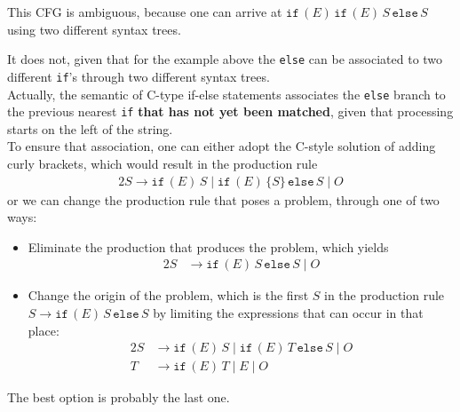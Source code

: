 \documentclass[docid=CA07]{tcom_CA}
\begin{document}
\setcounter{chapter}{6}
{
\renewcommand{\thesubsubsection}{\thesubsection\alph{subsubsection}}
This CFG is ambiguous, because one can arrive at $\mathtt{if}\,(E)\,\mathtt{if}\,(E)\,S\,\mathtt{else}\,S$ using two different syntax trees.
\begin{center}
\begin{minipage}{0.45\textwidth}
	\begin{center}
	\end{center}
\end{minipage}%
\begin{minipage}{0.40\textwidth}
	\begin{center}
	\end{center}
\end{minipage}
\end{center}
It does not, given that for the example above the \texttt{else} can be associated to two different \texttt{if}'s through two different syntax trees.\\
Actually, the semantic of C-type if-else statements associates the \texttt{else} branch to the previous nearest \texttt{if} \textbf{that has not yet been matched}, given that processing starts on the left of the string.\\
To ensure that association, one can either adopt the C-style solution of adding curly brackets, which would result in the production rule
\begin{alignat*}{2}
	S \rightarrow \mathtt{if}\,(E)\,S\mid \mathtt{if}\,(E)\,\{S\}\,\mathtt{else}\,S\mid O
\end{alignat*}
or we can change the production rule that poses a problem, through one of two ways:
\begin{itemize}
	\item Eliminate the production that produces the problem, which yields
	\begin{alignat*}{2}
		S &\rightarrow \mathtt{if}\,(E)\,S\,\mathtt{else}\,S\mid O
	\end{alignat*}
	\item Change the origin of the problem, which is the first $S$ in the production rule $S \rightarrow \mathtt{if}\,(E)\,S\,\mathtt{else}\,S$ by limiting the expressions that can occur in that place:
	\begin{alignat*}{2}
		S &\rightarrow \mathtt{if}\,(E)\,S\mid \mathtt{if}\,(E)\,T\,\mathtt{else}\,S\mid O\\
		T &\rightarrow \mathtt{if}\,(E)\,T\mid E \mid  O 
	\end{alignat*}
\end{itemize}
The best option is probably the last one.
}
\end{document}
